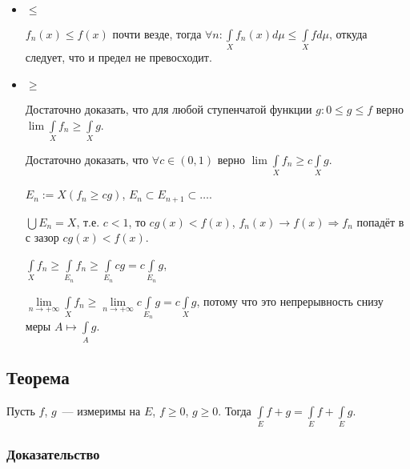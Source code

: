 \documentclass{article}
\begin{document}
            \begin{itemize}
            
                \item $\leqslant$
                
                    $f_n(x) \leqslant f(x)$ почти везде, тогда $\forall n : \int\limits_{X} f_n(x) d \mu \leqslant \int\limits_{X} f d \mu$, откуда следует, что и предел не превосходит.
                    
                \item $\geqslant$
                
                    Достаточно доказать, что для любой ступенчатой функции $g : 0 \leqslant g \leqslant f$ верно $\lim \int\limits_{X} f_n \geqslant \int\limits_{X} g$.
                    
                    Достаточно доказать, что $\forall c \in (0, 1)$ верно $\lim \int\limits_{X} f_n \geqslant c \int\limits_{X} g$.
                    
                    $E_n := X \left( f_n \geqslant cg \right)$, $E_n \subset E_{n + 1} \subset \ldots$.
                    
                    $\bigcup E_n = X$, т.е. $c < 1$, то $c g(x) < f(x)$, $f_n(x) \rightarrow f(x) \Rightarrow f_n$ попадёт в с зазор $c g(x) < f(x)$.
                    
                    $\int\limits_{X} f_n \geqslant \int\limits_{E_n} f_n \geqslant \int\limits_{E_n} c g = c \int\limits_{E_n} g$,
                    
                    $\lim\limits_{n \rightarrow +\infty} \int\limits_{X} f_n \geqslant \lim\limits_{n \rightarrow +\infty} c \int\limits_{E_n} g = c \int\limits_{X} g$, потому что это непрерывность снизу меры $A \mapsto \int\limits_{A} g$.
                    
            \end{itemize}
    
    \subsection{Теорема}
    
        Пусть $f$, $g$~--- измеримы на $E$, $f \geqslant 0$, $g \geqslant 0$. Тогда $\int\limits_{E} f + g = \int\limits_{E} f + \int\limits_{E} g$.
        
        \subsubsection{Доказательство}
        
\end{document}
